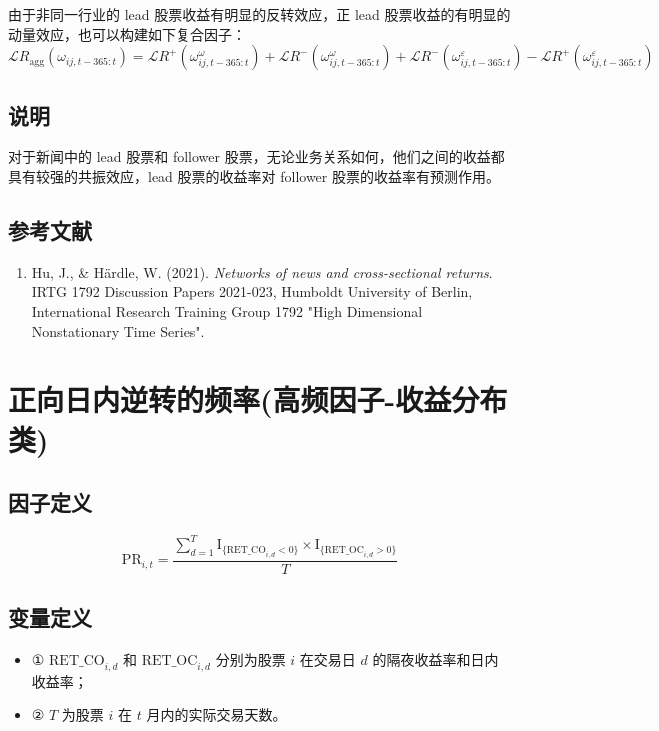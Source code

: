 \documentclass{article}
\begin{document}
由于非同一行业的 lead 股票收益有明显的反转效应，正 lead 股票收益的有明显的动量效应，也可以构建如下复合因子：
\begin{equation}
    \mathcal{L}R_{\mathrm{agg}} (\omega_{ij,t-365:t}) = \mathcal{L}R^{+} (\omega_{ij,t-365:t}^{\omega}) + \mathcal{L}R^{-} (\omega_{ij,t-365:t}^{\omega}) + \mathcal{L}R^{-} (\omega_{ij,t-365:t}^{\varepsilon}) - \mathcal{L}R^{+} (\omega_{ij,t-365:t}^{\varepsilon})
\end{equation}

\subsection{说明}
对于新闻中的 lead 股票和 follower 股票，无论业务关系如何，他们之间的收益都具有较强的共振效应，lead 股票的收益率对 follower 股票的收益率有预测作用。

\subsection{参考文献}
\begin{enumerate}
    \item Hu, J., \& Härdle, W. (2021). \textit{Networks of news and cross-sectional returns}. IRTG 1792 Discussion Papers 2021-023, Humboldt University of Berlin, International Research Training Group 1792 "High Dimensional Nonstationary Time Series".
\end{enumerate}

\section{正向日内逆转的频率(高频因子-收益分布类)}

\subsection{因子定义}
\begin{equation}
    \mathrm{PR}_{i,t} = \frac{\sum_{d=1}^{T} \mathrm{I}_{\{\mathrm{RET\_CO}_{i,d}<0\}} \times \mathrm{I}_{\{\mathrm{RET\_OC}_{i,d}>0\}}}{T}
\end{equation}

\subsection{变量定义}
\begin{itemize}
    \item ① \( \mathrm{RET\_CO}_{i,d} \) 和 \( \mathrm{RET\_OC}_{i,d} \) 分别为股票 \( i \) 在交易日 \( d \) 的隔夜收益率和日内收益率；
    \item ② \( T \) 为股票 \( i \) 在 \( t \) 月内的实际交易天数。
\end{itemize}
\end{document}
